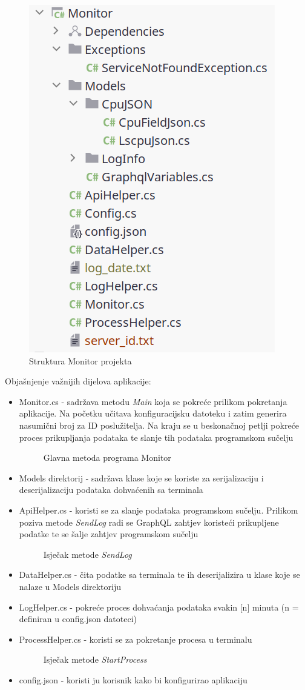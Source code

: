 \documentclass[zavrsnirad]{fer}
\begin{document}
\begin{figure}[htb!]
	\centering
	\includegraphics[width=0.4\linewidth]{images/monitor_structure.png} 
	\caption{Struktura Monitor projekta}
	\label{slk:monitor_structure.png}
\end{figure}
\FloatBarrier

Objašnjenje važnijih dijelova aplikacije:
\begin{itemize}
	\item Monitor.cs - sadržava metodu \textit{Main} koja se pokreće prilikom pokretanja aplikacije. Na početku učitava konfiguracijsku datoteku i zatim generira nasumični broj za ID poslužitelja. Na kraju se u beskonačnoj petlji pokreće proces prikupljanja podataka te slanje tih podataka programskom sučelju
	\begin{figure}[htb]
		\centering
		
		\caption{Glavna metoda programa Monitor}
	\end{figure}
	\FloatBarrier	
	\item Models direktorij - sadržava klase koje se koriste za serijalizaciju i deserijalizaciju podataka dohvaćenih sa terminala
	\item ApiHelper.cs - koristi se za slanje podataka programskom sučelju. Prilikom poziva metode \textit{SendLog} radi se GraphQL zahtjev koristeći prikupljene podatke te se šalje zahtjev programskom sučelju
	\begin{figure}[htb]
		\centering
		
		\caption{Isječak metode \textit{SendLog}}
	\end{figure}
	\FloatBarrier		
	\item DataHelper.cs - čita podatke sa terminala te ih deserijalizira u klase koje se nalaze u Models direktoriju
	\item LogHelper.cs - pokreće proces dohvaćanja podataka svakin [n] minuta (n = definiran u config.json datoteci)
	\item ProcessHelper.cs - koristi se za pokretanje procesa u terminalu
	\begin{figure}[htb]
		\centering
		
		\caption{Isječak metode \textit{StartProcess}}
	\end{figure}	
	\item config.json - koristi ju korisnik kako bi konfigurirao aplikaciju
\end{itemize}
\end{document}
